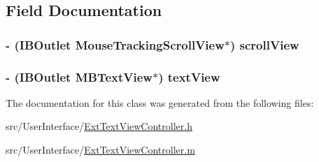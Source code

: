 \subsection{Field Documentation}
\hypertarget{interface_ext_text_view_controller_a85923391d7476cb50037cb7e79eb71de}{
\subsubsection[{scroll\-View}]{\setlength{\rightskip}{0pt plus 5cm}-\/ (I\-B\-Outlet {\bf Mouse\-Tracking\-Scroll\-View}$\ast$) scroll\-View\hspace{0.3cm}{\ttfamily [protected]}}}\label{interface_ext_text_view_controller_a85923391d7476cb50037cb7e79eb71de}
\hypertarget{interface_ext_text_view_controller_abfa30436fff57bf39e679f9046d4b9bd}{
\subsubsection[{text\-View}]{\setlength{\rightskip}{0pt plus 5cm}-\/ (I\-B\-Outlet {\bf M\-B\-Text\-View}$\ast$) text\-View\hspace{0.3cm}{\ttfamily [protected]}}}\label{interface_ext_text_view_controller_abfa30436fff57bf39e679f9046d4b9bd}


The documentation for this class was generated from the following files\-:\begin{DoxyCompactItemize}
\item 
src/\-User\-Interface/\hyperlink{_ext_text_view_controller_8h}{Ext\-Text\-View\-Controller.\-h}\item 
src/\-User\-Interface/\hyperlink{_ext_text_view_controller_8m}{Ext\-Text\-View\-Controller.\-m}\end{DoxyCompactItemize}
